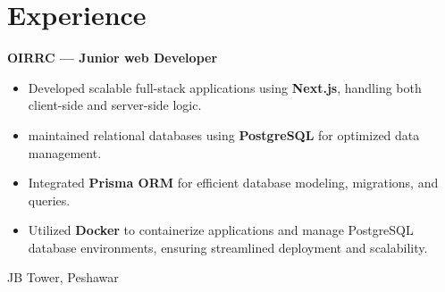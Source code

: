\documentclass[10pt, letterpaper]{article}
\newenvironment{highlights}{
    \begin{itemize}[
        topsep=0.10 cm,
        parsep=0.10 cm,
        partopsep=0pt,
        itemsep=0pt,
        leftmargin=0.4 cm + 10pt
    ]
}{
    \end{itemize}
}
\newenvironment{twocolentry}[2][]{
    \onecolentry
    \def\secondColumn{#2}
    \setcolumnwidth{\fill, 4.5 cm}
    \begin{paracol}{2}
}{
    \switchcolumn \raggedleft \secondColumn
    \end{paracol}
    \endonecolentry
}
\begin{document}
\section{Experience}

\begin{twocolentry}{
		JB Tower, Peshawar \\
	}
	\textbf{OIRRC — Junior web Developer}
	\begin{highlights}
		\item Developed scalable full-stack applications using \textbf{Next.js}, handling both client-side and server-side logic.
		\item maintained relational databases using \textbf{PostgreSQL} for optimized data management.
		\item Integrated \textbf{Prisma ORM} for efficient database modeling, migrations, and queries.
		\item Utilized \textbf{Docker} to containerize applications and manage PostgreSQL database environments, ensuring streamlined deployment and scalability.
	\end{highlights}
\end{twocolentry}
\end{document}
